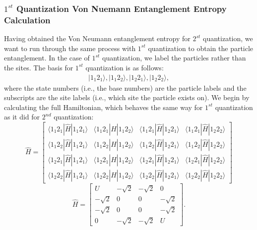 \subsubsection{$1^{st}$ Quantization Von Nuemann Entanglement Entropy Calculation}
Having obtained the Von Neumann entanglement entropy for $2^{st}$ quantization, we want to run through the same process with $1^{st}$ quantization to obtain the particle entanglement. In the case of $1^{st}$ quantization, we label the particles rather than the sites. The basis for $1^{st}$ quantization is as follows:
\begin{align}
|1_1 2_1 \rangle, |1_1 2_2 \rangle, |1_2 2_1 \rangle, |1_2 2_2 \rangle,
\end{align}
\noindent where the state numbers (i.e., the base numbers) are the particle labels and the subscripts are the site labels (i.e., which site the particle exists on). We begin by calculating the full Hamiltonian, which behaves the same way for $1^{st}$ quantization as it did for $2^{nd}$ quantization:
\begin{equation}
\hat{H} = \begin{bmatrix} \langle 1_1 2_1 | \hat{H} | 1_1 2_1 \rangle & \langle 1_1 2_1 | \hat{H} | 1_1 2_2 \rangle & \langle 1_1 2_1 | \hat{H} | 1_2 2_1 \rangle & \langle 1_1 2_1 | \hat{H} | 1_2 2_2 \rangle \\ \langle 1_1 2_2 | \hat{H} | 1_1 2_1 \rangle & \langle 1_1 2_2 | \hat{H} | 1_1 2_2 \rangle & \langle 1_1 2_2 | \hat{H} | 1_2 2_1 \rangle & \langle 1_1 2_2 | \hat{H} | 1_2 2_2 \rangle \\ \langle 1_2 2_1 | \hat{H} | 1_1 2_1 \rangle & \langle 1_2 2_1 | \hat{H} | 1_1 2_2 \rangle & \langle 1_2 2_1 | \hat{H} | 1_2 2_1 \rangle & \langle 1_2 2_1 | \hat{H} | 1_2 2_2 \rangle \\ \langle 1_2 2_2 | \hat{H} | 1_1 2_1 \rangle & \langle 1_2 2_2 | \hat{H} | 1_1 2_2 \rangle & \langle 1_2 2_2 | \hat{H} | 1_2 2_1 \rangle & \langle 1_2 2_2 | \hat{H} | 1_2 2_2 \rangle \end{bmatrix} 
\end{equation}
\begin{equation}
\hat{H} = \begin{bmatrix} U & -\sqrt{2} & -\sqrt{2} & 0 \\ -\sqrt{2} & 0 & 0 & -\sqrt{2} \\ -\sqrt{2} & 0 & 0 & -\sqrt{2} \\ 0 & -\sqrt{2} & -\sqrt{2} & U \end{bmatrix}.
\end{equation}

